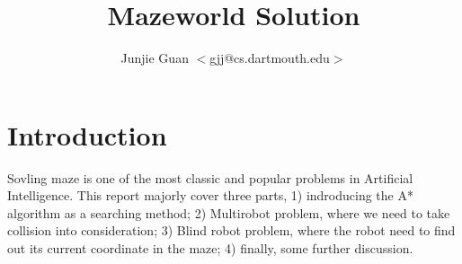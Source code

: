 \documentclass{article}
\title{Mazeworld Solution}
\author{Junjie Guan $<$gjj@cs.dartmouth.edu$>$}
\begin{document}
\maketitle

\tableofcontents

\section{Introduction}

Sovling maze is one of the most classic and popular problems in Artificial Intelligence. This report majorly cover three parts, 1) indroducing the A* algorithm as a searching method; 2) Multirobot problem, where we need to take collision into consideration; 3) Blind robot problem, where the robot need to find out its current coordinate in the maze; 4) finally, some further discussion.



\end{document}
